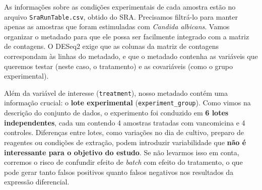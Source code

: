 \documentclass[
  letterpaper,
  DIV=11,
  numbers=noendperiod]{scrreprt}
\newenvironment{Shaded}{\begin{snugshade}}{\end{snugshade}}
\newcommand{\AttributeTok}[1]{\textcolor[rgb]{0.40,0.45,0.13}{#1}}
\newcommand{\CommentTok}[1]{\textcolor[rgb]{0.37,0.37,0.37}{#1}}
\newcommand{\ConstantTok}[1]{\textcolor[rgb]{0.56,0.35,0.01}{#1}}
\newcommand{\DecValTok}[1]{\textcolor[rgb]{0.68,0.00,0.00}{#1}}
\newcommand{\FunctionTok}[1]{\textcolor[rgb]{0.28,0.35,0.67}{#1}}
\newcommand{\NormalTok}[1]{\textcolor[rgb]{0.00,0.23,0.31}{#1}}
\newcommand{\OtherTok}[1]{\textcolor[rgb]{0.00,0.23,0.31}{#1}}
\newcommand{\SpecialCharTok}[1]{\textcolor[rgb]{0.37,0.37,0.37}{#1}}
\newcommand{\StringTok}[1]{\textcolor[rgb]{0.13,0.47,0.30}{#1}}
\begin{document}
As informações sobre as condições experimentais de cada amostra estão no
arquivo \texttt{SraRunTable.csv}, obtido do SRA. Precisamos filtrá-lo
para manter apenas as amostras que foram estimuladas com \emph{Candida
albicans}. Vamos organizar o metadado para que ele possa ser facilmente
integrado com a matriz de contagens. O DESeq2 exige que as colunas da
matriz de contagens correspondam às linhas do metadado, e que o metadado
contenha as variáveis que queremos testar (neste caso, o tratamento) e
as covariáveis (como o grupo experimental).

Além da variável de interesse (\texttt{treatment}), nosso metadado
contém uma informação crucial: o \textbf{lote experimental}
(\texttt{experiment\_group}). Como vimos na descrição do conjunto de
dados, o experimento foi conduzido em \textbf{6 lotes independentes},
cada um contendo 4 amostras tratadas com vancomicina e 4 controles.
Diferenças entre lotes, como variações no dia de cultivo, preparo de
reagentes ou condições de extração, podem introduzir variabilidade que
\textbf{não é interessante para o objetivo do estudo}. Se não levarmos
isso em conta, corremos o risco de confundir efeito de \emph{batch} com
efeito do tratamento, o que pode gerar tanto falsos positivos quanto
falsos negativos nos resultados da expressão diferencial.

\begin{Shaded}
\end{Shaded}
\end{document}
